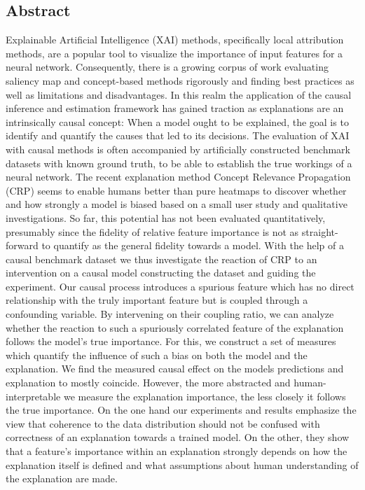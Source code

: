 \pagestyle{empty}
\subsection*{Abstract}


Explainable Artificial Intelligence (XAI) methods, specifically local attribution methods, are a popular tool to visualize the importance of input features for a neural network.
Consequently, there is a growing corpus of work evaluating saliency map and concept-based methods rigorously and finding best practices as well as limitations and disadvantages. In this realm the application of the causal inference and estimation framework has gained traction as explanations are an intrinsically causal concept: When a model ought to be explained, the goal is to identify and quantify the causes that led to its decisions. The evaluation of XAI with causal methods is often accompanied by artificially constructed benchmark datasets with known ground truth, to be able to establish the true workings of a neural network. 
The recent explanation method Concept Relevance Propagation (CRP) seems to enable humans better than pure heatmaps to discover whether and how strongly a model is biased based on a small user study and qualitative investigations. So far, this potential has not been evaluated quantitatively, presumably since the fidelity of relative feature importance is not as straight-forward to quantify as the general fidelity towards a model. 
With the help of a causal benchmark dataset we thus investigate the reaction of CRP to an intervention on a causal model constructing the dataset and guiding the experiment. Our causal process introduces a spurious feature which has no direct relationship with the truly important feature but is coupled through a confounding variable. By intervening on their coupling ratio, we can analyze whether the reaction to such a spuriously correlated feature of the explanation follows the model's true importance. For this, we construct a set of measures which quantify the influence of such a bias on both the model and the explanation. We find the measured causal effect on the models predictions and explanation to mostly coincide. However, the more abstracted and human-interpretable we measure the explanation importance, the less closely it follows the true importance. 
On the one hand our experiments and results emphasize the view that coherence to the data distribution should not be confused with correctness of an explanation towards a trained model. On the other, they show that a feature's importance within an explanation strongly depends on how the explanation itself is defined and what assumptions about human understanding of the explanation are made.
